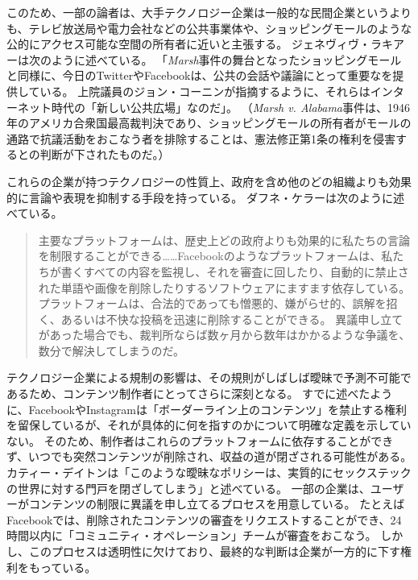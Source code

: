 \documentclass[paper=a4,book,openany]{jlreq}
\newcommand{\ig}[1]{}           %
\begin{document}
このため、一部の論者は、大手テクノロジー企業は一般的な民間企業というよりも、テレビ放送局や電力会社などの公共事業体や、ショッピングモールのような公的にアクセス可能な空間の所有者に近いと主張する\citep{swire17:_shoul_leadin_onlin_tech_compan}。
ジェネヴィヴ・ラキアー\ig{Genevieve Lakier}は次のように述べている。
「\emph{Marsh}事件の舞台となったショッピングモールと同様に、今日のTwitterやFacebookは、公共の会話や議論にとって重要なを提供している。
上院議員のジョン・コーニン\ig{John Cornyn}が指摘するように、それらはインターネット時代の「新しい公共広場」なのだ」\citep{lakier21:_great_free_speec_rever}。
（\emph{Marsh v. Alabama}事件は、1946年のアメリカ合衆国最高裁判決であり、ショッピングモールの所有者がモールの通路で抗議活動をおこなう者を排除することは、憲法修正第1条の権利を侵害するとの判断が下されたものだ。）

これらの企業が持つテクノロジーの性質上、政府を含め他のどの組織よりも効果的に言論や表現を抑制する手段を持っている。
ダフネ・ケラーは次のように述べている。

\begin{quote}
主要なプラットフォームは、歴史上どの政府よりも効果的に私たちの言論を制限することができる……Facebookのようなプラットフォームは、私たちが書くすべての内容を監視し、それを審査に回したり、自動的に禁止された単語や画像を削除したりするソフトウェアにますます依存している。
プラットフォームは、合法的であっても憎悪的、嫌がらせ的、誤解を招く、あるいは不快な投稿を迅速に削除することができる。
異議申し立てがあった場合でも、裁判所ならば数ヶ月から数年はかかるような争議を、数分で解決してしまうのだ。
\citep{keller19:_faceb_restr_speec_popul_deman}
\end{quote}

テクノロジー企業による規制の影響は、その規則がしばしば曖昧で予測不可能であるため、コンテンツ制作者にとってさらに深刻となる。
すでに述べたように、FacebookやInstagramは「ボーダーライン上のコンテンツ」を禁止する権利を留保しているが、それが具体的に何を指すのかについて明確な定義を示していない。
そのため、制作者はこれらのプラットフォームに依存することができず、いつでも突然コンテンツが削除され、収益の道が閉ざされる可能性がある。
カティー・デイトンは「このような曖昧なポリシーは、実質的にセックステックの世界に対する門戸を閉ざしてしまう」と述べている\citep{deighton20:_why_sex_start_face_uphil_paymen_battl}。
一部の企業は、ユーザーがコンテンツの制限に異議を申し立てるプロセスを用意している。
たとえばFacebookでは、削除されたコンテンツの審査をリクエストすることができ、24時間以内に「コミュニティ・オペレーション」チームが審査をおこなう。
しかし、このプロセスは透明性に欠けており、最終的な判断は企業が一方的に下す権利をもっている。
\end{document}
